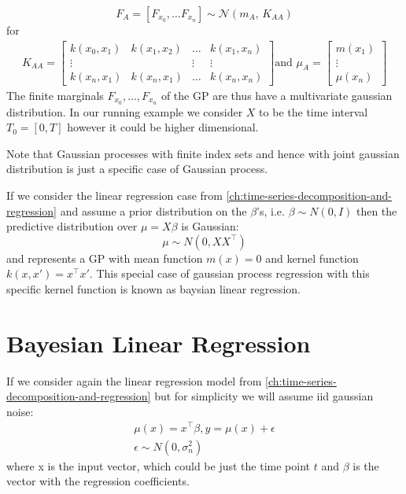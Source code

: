 \[F_A = [F_{x_0}, \dots F_{x_n}] \sim \mathcal{N}(m_A,\,K_{AA})\]
for
\begin{gather*}
    K_{AA} =
    \begin{bmatrix}
        k(x_0, x_1) & k(x_1, x_2) & \dots & k(x_1, x_n)\\
        \vdots  &  & \vdots  & \vdots \\
        k(x_n, x_1)  & k(x_n, x_1) & \dots  & k(x_n, x_n)
    \end{bmatrix} \text{and }
    \mu_A =
    \begin{bmatrix}
        m(x_1) \\
        \vdots \\
        \mu(x_n)
    \end{bmatrix}
\end{gather*}
The finite marginals $F_{x_0}, \dots, F_{x_n}$ of the GP are thus have a multivariate gaussian distribution.
In our running example we consider $X$ to be the time interval $T_0=[0, T]$ however it could be higher dimensional.

Note that Gaussian processes with finite index sets and hence with joint gaussian distribution is just a specific case
of Gaussian process.

If we consider the linear regression case from \ref{ch:time-series-decomposition-and-regression} and assume a prior distribution
on the $\beta$'s, i.e. $\beta \sim N(0, I)$ then the predictive distribution over $\mu = X \beta$ is Gaussian:
\[
    \mu \sim N(0, XX^{\top})
\]
and represents a GP with mean function $m(x) = 0$ and kernel function $k(x, x') = x^{\top}x'$.
This special case of gaussian process regression with this specific kernel function is known as baysian linear regression.


\section{Bayesian Linear Regression}

If we consider again the linear regression model from \ref{ch:time-series-decomposition-and-regression} but
for simplicity we will assume iid gaussian noise:
\begin{gather}
       \mu(x) = x^{\top}\beta, y = \mu(x) + \epsilon \\
    \epsilon \sim N(0, \sigma_n^2)
\end{gather}
where x is the input vector, which could be just the time point $t$ and $\beta$ is the vector with the regression coefficients.

